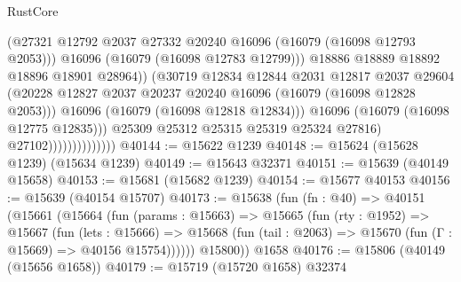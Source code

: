 \begin{lexlean}{RustCore}
\begin{coremodule}
                                          (@27321
                                            @12792
                                            @2037
                                            @27332
                                            @20240
                                            @16096
                                            (@16079 (@16098 @12793 @2053)))
                                          @16096
                                          (@16079 (@16098 @12783 @12799)))
                                        @18886
                                        @18889
                                        @18892
                                        @18896
                                        @18901
                                        @28964))
                                    (@30719
                                      @12834
                                      @12844
                                      @2031
                                      @12817
                                      @2037
                                      @29604
                                      (@20228
                                        @12827
                                        @2037
                                        @20237
                                        @20240
                                        @16096
                                        (@16079 (@16098 @12828 @2053)))
                                      @16096
                                      (@16079 (@16098 @12818 @12834)))
                                    @16096
                                    (@16079 (@16098 @12775 @12835)))
                                  @25309
                                  @25312
                                  @25315
                                  @25319
                                  @25324
                                  @27816)
                                @27102))))))))))))))
@40144 := @15622 @1239
@40148 := @15624 (@15628 @1239) (@15634 @1239)
@40149 := @15643 @32371
@40151 := @15639 (@40149 @15658)
@40153 := @15681 (@15682 @1239)
@40154 := @15677 @40153
@40156 := @15639 (@40154 @15707)
@40173 := @15638
    (fun (fn : @40) =>
    @40151
      (@15661
        (@15664
          (fun (params : @15663) =>
          @15665
            (fun (rty : @1952) =>
            @15667
              (fun (lets : @15666) =>
              @15668 (fun (tail : @2063) => @15670 (fun (Γ : @15669) => @40156 @15754))))))
        @15800))
    @1658
@40176 := @15806 (@40149 (@15656 @1658))
@40179 := @15719 (@15720 @1658) @32374

\end{coremodule}
\end{lexlean}
